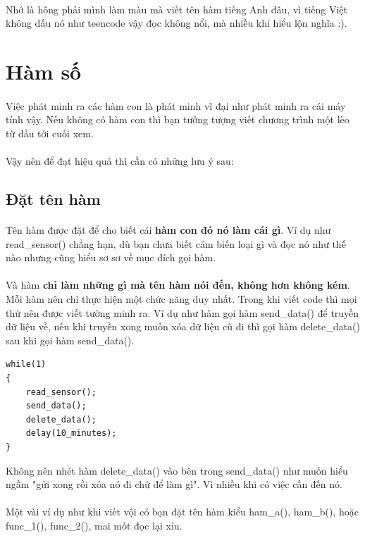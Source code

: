 \documentclass[12pt,a5paper]{book}
\begin{document}
\paragraph{}
Nhớ là hông phải mình làm màu mà viết tên hàm tiếng Anh đâu, vì tiếng Việt không dấu nó như teencode vậy đọc không nổi, mà nhiều khi hiểu lộn nghĩa :).
\section{Hàm số}
\paragraph{}
Việc phát minh ra các hàm con là phát minh vĩ đại như phát minh ra cái máy tính vậy. Nếu không có hàm con thì bạn tưởng tượng viết chương trình một lèo từ đầu tới cuối xem.
\paragraph{}
Vậy nên để đạt hiệu quả thì cần có những lưu ý sau:
\subsection{Đặt tên hàm}
\paragraph{}
Tên hàm được đặt để cho biết cái \textbf{hàm con đó nó làm cái gì}. Ví dụ như read\_sensor() chẳng hạn, dù bạn chưa biết cảm biến loại gì và đọc nó như thế nào nhưng cũng hiểu sơ sơ về mục đích gọi hàm.
\paragraph{}
Và hàm \textbf{chỉ làm những gì mà tên hàm nói đến, không hơn không kém}. Mỗi hàm nên chỉ thực hiện một chức năng duy nhất. Trong khi viết code thì mọi thứ nên được viết tường minh ra. Ví dụ như hàm gọi hàm send\_data() để truyền dữ liệu về, nếu khi truyền xong muốn xóa dữ liệu cũ đi thì gọi hàm delete\_data() sau khi gọi hàm send\_data().
\begin{lstlisting}
while(1)
{
	read_sensor();
	send_data();
	delete_data();
	delay(10_minutes);
}
\end{lstlisting}
Không nên nhét hàm delete\_data() vào bên trong send\_data() như muốn hiểu ngầm "gửi xong rồi xóa nó đi chứ để làm gì". Vì nhiều khi có việc cần đến nó.
\paragraph{}
Một vài ví dụ như khi viết vội có bạn đặt tên hàm kiểu ham\_a(), ham\_b(), hoặc func\_1(), func\_2(), mai mốt đọc lại xỉu.
\end{document}
